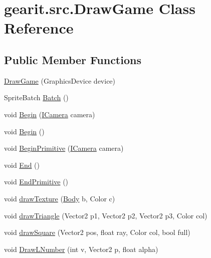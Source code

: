 \hypertarget{classgearit_1_1src_1_1_draw_game}{\section{gearit.\+src.\+Draw\+Game Class Reference}
\label{classgearit_1_1src_1_1_draw_game}
}
\subsection*{Public Member Functions}
\begin{DoxyCompactItemize}
\item 
\hyperlink{classgearit_1_1src_1_1_draw_game_a81b95a90673dd1486cde1896197c1488}{Draw\+Game} (Graphics\+Device device)
\item 
Sprite\+Batch \hyperlink{classgearit_1_1src_1_1_draw_game_ab14864ccf48b3bc23c94b707f294a576}{Batch} ()
\item 
void \hyperlink{classgearit_1_1src_1_1_draw_game_acfbcd9318dda537ccbadf0fb6d550308}{Begin} (\hyperlink{interfacegearit_1_1src_1_1utility_1_1_i_camera}{I\+Camera} camera)
\item 
void \hyperlink{classgearit_1_1src_1_1_draw_game_ab68d60216c1778fb995376f7c139c26a}{Begin} ()
\item 
void \hyperlink{classgearit_1_1src_1_1_draw_game_abd94932a00fe2bfeff1fc4f6f116a52a}{Begin\+Primitive} (\hyperlink{interfacegearit_1_1src_1_1utility_1_1_i_camera}{I\+Camera} camera)
\item 
void \hyperlink{classgearit_1_1src_1_1_draw_game_a8b0ba0af9a3d84a02fbf2cdf97855681}{End} ()
\item 
void \hyperlink{classgearit_1_1src_1_1_draw_game_a80684ee1863387eff416187cf693474b}{End\+Primitive} ()
\item 
void \hyperlink{classgearit_1_1src_1_1_draw_game_ac7adcca12a1c26baa80c1c47afda88f0}{draw\+Texture} (\hyperlink{class_farseer_physics_1_1_dynamics_1_1_body}{Body} b, Color c)
\item 
void \hyperlink{classgearit_1_1src_1_1_draw_game_accefffd1944ab7f864cb308129931c6d}{draw\+Triangle} (Vector2 p1, Vector2 p2, Vector2 p3, Color col)
\item 
void \hyperlink{classgearit_1_1src_1_1_draw_game_af3963ef698190db14eec0204a070d410}{draw\+Square} (Vector2 pos, float ray, Color col, bool full)
\item 
void \hyperlink{classgearit_1_1src_1_1_draw_game_ac310972d0b2b0f21cefbba43951002de}{Draw\+L\+Number} (int v, Vector2 p, float alpha)

\end{DoxyCompactItemize}
